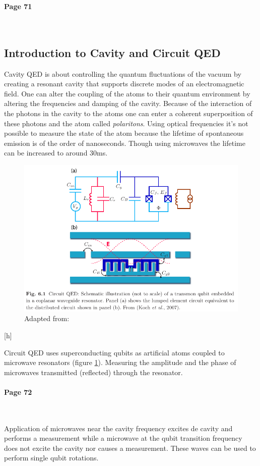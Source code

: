 \documentclass[12pt]{article}
\numberwithin{equation}{subsection}
\newcommand\page[1]{
{
\color{blue}\paragraph{
Page #1
}\mbox{}\\
}
}
\begin{document}
\page{71}
\subsection{Introduction to Cavity and Circuit QED}
Cavity QED is about controlling the quantum fluctuations of the vacuum by creating a resonant cavity that supports discrete modes of an electromagnetic field.
One can alter the coupling of the atoms to their quantum environment by altering the frequencies and damping of the cavity. 
Because of the interaction of the photons in the cavity to the atoms one can enter a coherent superposition of these photons and the atom called \emph{polaritons}.
Using optical frequencies it's not possible to measure the state of the atom because the lifetime of spontaneous emission is of the order of nanoseconds. Though using microwaves the lifetime can be increased to around 30ms.

\begin{figure}[h]
\includegraphics[scale=0.5]{images/73-circuit-qed.png}
\caption{Adapted from: \cite{Girvin2015CircuitQS}}
\label{73-circuit-qed}
\end{figure}[h]


Circuit QED uses superconducting qubits as artificial atoms coupled to microwave resonators (figure  \ref{73-circuit-qed}). Measuring the amplitude and the phase of microwaves transmitted (reflected) through the resonator.

\page{72}
Application of microwaves near the cavity frequency excites de cavity and performs a measurement while a microwave at the qubit transition frequency does not excite the cavity nor causes a measurement. These waves can be used to perform single qubit rotations.
\end{document}
